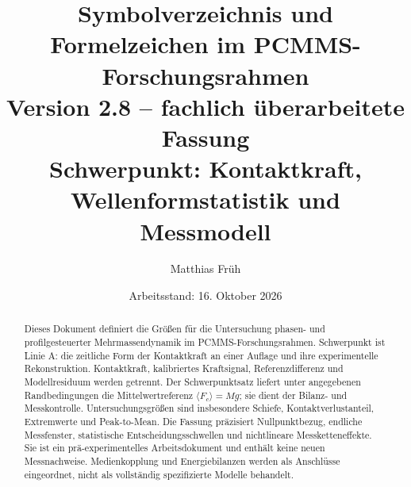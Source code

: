 \documentclass[11pt,a4paper]{article}
\begin{document}
\title{Symbolverzeichnis und Formelzeichen im PCMMS-Forschungsrahmen\\[.5em]\large Version 2.8 -- fachlich überarbeitete Fassung\\Schwerpunkt: Kontaktkraft, Wellenformstatistik und Messmodell}
\author{Matthias Früh}
\date{Arbeitsstand: 16. Oktober 2026}
\maketitle
\begin{abstract}
Dieses Dokument definiert die Größen für die Untersuchung phasen- und profilgesteuerter Mehrmassendynamik im PCMMS-Forschungsrahmen. Schwerpunkt ist Linie A: die zeitliche Form der Kontaktkraft an einer Auflage und ihre experimentelle Rekonstruktion. Kontaktkraft, kalibriertes Kraftsignal, Referenzdifferenz und Modellresiduum werden getrennt. Der Schwerpunktsatz liefert unter angegebenen Randbedingungen die Mit\-tel\-wert\-re\-fe\-renz $\langle F_c\rangle=Mg$; sie dient der Bilanz- und Messkontrolle. Untersuchungsgrößen sind insbesondere Schiefe, Kontaktverlustanteil, Extremwerte und Peak-to-Mean. Die Fassung präzisiert Nullpunktbezug, endliche Messfenster, statistische Entscheidungsschwellen und nichtlineare Messketteneffekte. Sie ist ein prä-experimentelles Arbeitsdokument und enthält keine neuen Messnachweise. Medienkopplung und Energiebilanzen werden als Anschlüsse eingeordnet, nicht als vollständig spezifizierte Modelle behandelt.
\end{abstract}
\clearpage
\tableofcontents
\clearpage
\end{document}
